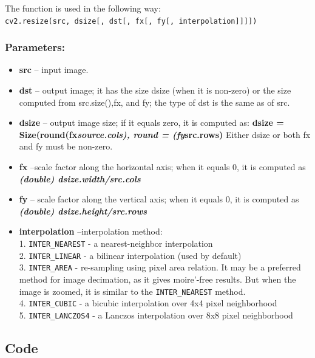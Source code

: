 \documentclass[]{article}
\providecommand{\tightlist}{%
  \setlength{\itemsep}{0pt}\setlength{\parskip}{0pt}}
\begin{document}
The function is used in the following way:\\
\texttt{cv2.resize(src,\ dsize{[},\ dst{[},\ fx{[},\ fy{[},\ interpolation{]}{]}{]}{]})}

\subsubsection{Parameters:}\label{parameters}

\begin{itemize}
\tightlist
\item
  \textbf{src} -- input image.
\item
  \textbf{dst} -- output image; it has the size dsize (when it is
  non-zero) or the size computed from src.size(),fx, and fy; the type of
  dst is the same as of src.
\item
  \textbf{dsize} -- output image size; if it equals zero, it is computed
  as: \textbf{dsize = Size(round(fx\emph{source.cols), round =
  (fy}src.rows)} Either dsize or both fx and fy must be non-zero.
\item
  \textbf{fx} --scale factor along the horizontal axis; when it equals
  0, it is computed as\\
   \emph{\textbf{(double) dsize.width/src.cols}}
\item
  \textbf{fy} -- scale factor along the vertical axis; when it equals 0,
  it is computed as\\
  \emph{\textbf{(double) dsize.height/src.rows}}
\item
  \textbf{interpolation} --interpolation method:\\
   1. \texttt{INTER\_NEAREST} - a nearest-neighbor interpolation\\
   2. \texttt{INTER\_LINEAR} - a bilinear interpolation (used by
  default)\\
   3. \texttt{INTER\_AREA} - re-sampling using pixel area relation. It
  may be a preferred method for image decimation, as it gives
  moire'-free results. But when the image is zoomed, it is similar to
  the \texttt{INTER\_NEAREST} method.\\
   4. \texttt{INTER\_CUBIC} - a bicubic interpolation over 4x4 pixel
  neighborhood\\
   5. \texttt{INTER\_LANCZOS4} - a Lanczos interpolation over 8x8 pixel
  neighborhood
\end{itemize}

\subsection{Code}\label{code}
\end{document}
